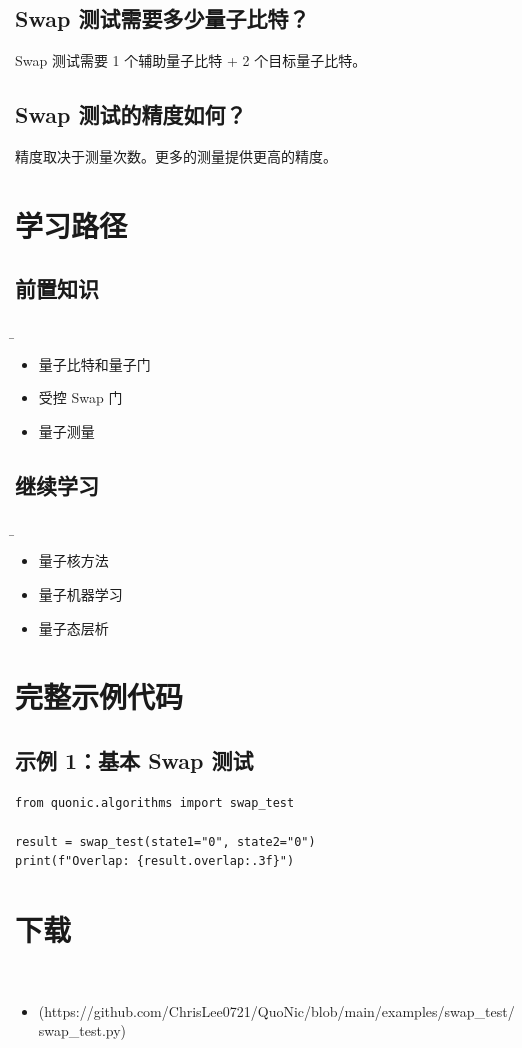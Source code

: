 \documentclass[12pt,a4paper]{article}
\begin{document}
\subsection{Swap 测试需要多少量子比特？}

Swap 测试需要 1 个辅助量子比特 + 2 个目标量子比特。

\subsection{Swap 测试的精度如何？}

精度取决于测量次数。更多的测量提供更高的精度。

\section{学习路径}

\subsection{前置知识}
\b\begin{itemize}
  \item 量子比特和量子门
  \item 受控 Swap 门
  \item 量子测量
\end{itemize}

\subsection{继续学习}
\b\begin{itemize}
  \item 量子核方法
  \item 量子机器学习
  \item 量子态层析
\end{itemize}

\section{完整示例代码}

\subsection{示例 1：基本 Swap 测试}

\begin{lstlisting}[style=python]
from quonic.algorithms import swap_test

result = swap_test(state1="0", state2="0")
print(f"Overlap: {result.overlap:.3f}")
\end{lstlisting}


\section{下载}

\begin{itemize}
  \item [swap_test.py](https://github.com/ChrisLee0721/QuoNic/blob/main/examples/swap_test/swap_test.py)
\end{itemize}
\end{document}
